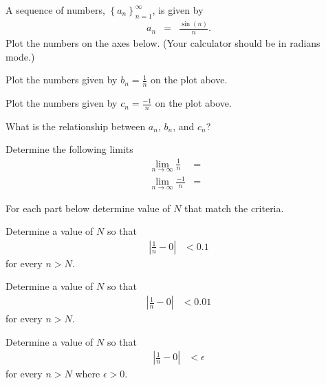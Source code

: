 \begin{problem}
\item A sequence of numbers, $\left\{ a_n \right\}_{n=1}^\infty$, is
  given by
  \begin{eqnarray*}
    a_n & = & \frac{\sin(n)}{n}.
  \end{eqnarray*}
  Plot the numbers on the axes below. (Your calculator should be in radians mode.)

  \scalebox{0.75}{}

  \begin{subproblem}
  \item Plot the numbers given by $b_n=\frac{1}{n}$ on the plot
    above.
  \item Plot the numbers given by $c_n=\frac{-1}{n}$ on the plot
    above.
  \item What is the relationship between $a_n$, $b_n$, and $c_n$?
    \vfill
  \item Determine the following limits
    \begin{eqnarray*}
      \lim_{n\rightarrow\infty} \frac{1}{n} & = & \\
      \lim_{n\rightarrow\infty} \frac{-1}{n} & = &
    \end{eqnarray*}
  \end{subproblem}

  \clearpage

  \item For each part below determine value of $N$ that match the criteria.
  \begin{subproblem}
    \item Determine a value of $N$ so that
    \begin{eqnarray*}
      \left| \frac{1}{n} - 0 \right| &  < 0.1
    \end{eqnarray*}
    for every $n>N$.

    \vfill

    \item Determine a value of $N$ so that
    \begin{eqnarray*}
      \left| \frac{1}{n} - 0 \right| &  < 0.01
    \end{eqnarray*}
    for every $n>N$.

    \vfill

    \item Determine a value of $N$ so that
    \begin{eqnarray*}
      \left| \frac{1}{n} - 0 \right| &  < \epsilon
    \end{eqnarray*}
    for every $n>N$ where $\epsilon>0$.

    \vfill

  \end{subproblem}
\end{problem}

